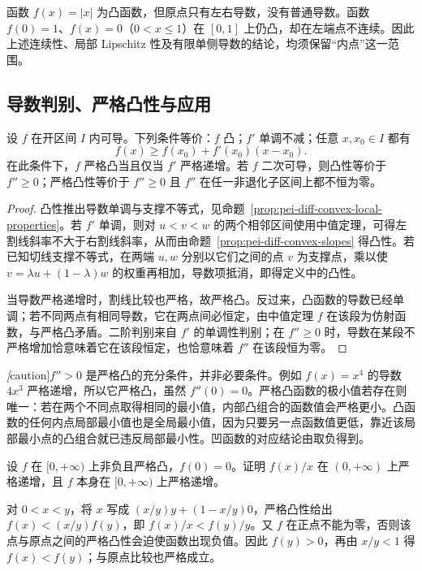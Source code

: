 \begin{notealert}[type=caution,title={凸性不保证端点连续或处处可导}]
函数 $f(x)=|x|$ 为凸函数，但原点只有左右导数，没有普通导数。函数 $f(0)=1$、$f(x)=0$（$0<x\le1$）在 $[0,1]$ 上仍凸，却在左端点不连续。因此上述连续性、局部 Lipschitz 性及有限单侧导数的结论，均须保留“内点”这一范围。
\end{notealert}

\subsection{导数判别、严格凸性与应用}

\begin{theorem}
\label{thm:pei-diff-convex-derivatives}
设 $f$ 在开区间 $I$ 内可导。下列条件等价：$f$ 凸；$f'$ 单调不减；任意 $x,x_0\in I$ 都有
\[
 f(x)\ge f(x_0)+f'(x_0)(x-x_0).
\]
在此条件下，$f$ 严格凸当且仅当 $f'$ 严格递增。若 $f$ 二次可导，则凸性等价于 $f''\ge0$；严格凸性等价于 $f''\ge0$ 且 $f''$ 在任一非退化子区间上都不恒为零。
\end{theorem}
\begin{proof}
凸性推出导数单调与支撑不等式，见命题~\ref{prop:pei-diff-convex-local-properties}。若 $f'$ 单调，则对 $u<v<w$ 的两个相邻区间使用中值定理，可得左割线斜率不大于右割线斜率，从而由命题~\ref{prop:pei-diff-convex-slopes} 得凸性。若已知切线支撑不等式，在两端 $u,w$ 分别以它们之间的点 $v$ 为支撑点，乘以使 $v=\lambda u+(1-\lambda)w$ 的权重再相加，导数项抵消，即得定义中的凸性。

当导数严格递增时，割线比较也严格，故严格凸。反过来，凸函数的导数已经单调；若不同两点有相同导数，它在两点间必恒定，由中值定理 $f$ 在该段为仿射函数，与严格凸矛盾。二阶判别来自 $f'$ 的单调性判别；在 $f''\ge0$ 时，导数在某段不严格增加恰意味着它在该段恒定，也恰意味着 $f''$ 在该段恒为零。
\end{proof}

\emph[caution]{$f''>0$ 是严格凸的充分条件，并非必要条件}。例如 $f(x)=x^4$ 的导数 $4x^3$ 严格递增，所以它严格凸，虽然 $f''(0)=0$。严格凸函数的极小值若存在则唯一：若在两个不同点取得相同的最小值，内部凸组合的函数值会严格更小。凸函数的任何内点局部最小值也是全局最小值，因为只要另一点函数值更低，靠近该局部最小点的凸组合就已违反局部最小性。凹函数的对应结论由取负得到。

\begin{example}
\label{ex:pei-diff-convex-ratio}
设 $f$ 在 $[0,+\infty)$ 上非负且严格凸，$f(0)=0$。证明 $f(x)/x$ 在 $(0,+\infty)$ 上严格递增，且 $f$ 本身在 $[0,+\infty)$ 上严格递增。
\end{example}
\begin{solve}
对 $0<x<y$，将 $x$ 写成 $(x/y)y+(1-x/y)0$，严格凸性给出 $f(x)<(x/y)f(y)$，即 $f(x)/x<f(y)/y$。又 $f$ 在正点不能为零，否则该点与原点之间的严格凸性会迫使函数出现负值。因此 $f(y)>0$，再由 $x/y<1$ 得 $f(x)<f(y)$；与原点比较也严格成立。
\end{solve}

